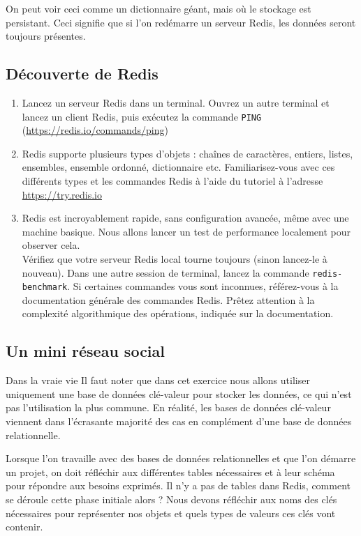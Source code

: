 \documentclass[a4paper,10pt]{article}
\begin{document}
  On peut voir ceci comme un dictionnaire géant, mais où le stockage est persistant. Ceci signifie que si l'on redémarre un serveur Redis, les données seront toujours présentes.
  \subsection{Découverte de Redis}
    \begin{enumerate}
      \item Lancez un serveur Redis dans un terminal. Ouvrez un autre terminal et lancez un client Redis, puis exécutez la commande \texttt{PING} (\url{https://redis.io/commands/ping})
      \item Redis supporte plusieurs types d'objets : chaînes de caractères, entiers, listes, ensembles, ensemble ordonné, dictionnaire etc. Familiarisez-vous avec ces différents types et les commandes Redis à l'aide du tutoriel à l'adresse \url{https://try.redis.io}
      \item Redis est incroyablement rapide, sans configuration avancée, même avec une machine basique. Nous allons lancer un test de performance localement pour observer cela.\\

      Vérifiez que votre serveur Redis local tourne toujours (sinon lancez-le à nouveau). Dans une autre session de terminal, lancez la commande \texttt{redis-benchmark}. Si certaines commandes vous sont inconnues, référez-vous à la documentation générale des commandes Redis. Prêtez attention à la complexité algorithmique des opérations, indiquée sur la documentation.
    \end{enumerate}

  \subsection{Un mini réseau social}
    \begin{bclogo}[logo = \bcinfo, arrondi = 0.1, ombre = true , epOmbre = 0.1, couleurOmbre = black!30,  barre =none, couleurBarre=bleuF]{Dans la vraie vie}
      Il faut noter que dans cet exercice nous allons utiliser uniquement une base de données clé-valeur pour stocker les données, ce qui n'est pas l'utilisation la plus commune. En réalité, les bases de données clé-valeur viennent dans l'écrasante majorité des cas en complément d'une base de données relationnelle.
    \end{bclogo}
    Lorsque l'on travaille avec des bases de données relationnelles et que l'on démarre un projet, on doit réfléchir aux différentes tables nécessaires et à leur schéma pour répondre aux besoins exprimés. Il n'y a pas de tables dans Redis, comment se déroule cette phase initiale alors ? Nous devons réfléchir aux noms des clés nécessaires pour représenter nos objets et quels types de valeurs ces clés vont contenir.
\end{document}
